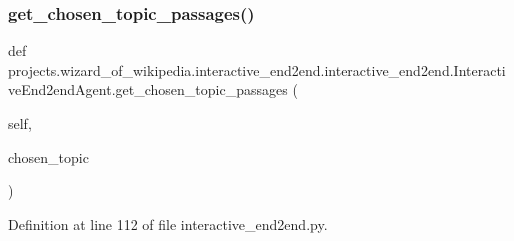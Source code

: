 \subsubsection{\texorpdfstring{get\+\_\+chosen\+\_\+topic\+\_\+passages()}{get\_chosen\_topic\_passages()}}
{\footnotesize\ttfamily def projects.\+wizard\+\_\+of\+\_\+wikipedia.\+interactive\+\_\+end2end.\+interactive\+\_\+end2end.\+Interactive\+End2end\+Agent.\+get\+\_\+chosen\+\_\+topic\+\_\+passages (\begin{DoxyParamCaption}\item[{}]{self,  }\item[{}]{chosen\+\_\+topic }\end{DoxyParamCaption})}



Definition at line 112 of file interactive\+\_\+end2end.\+py.


